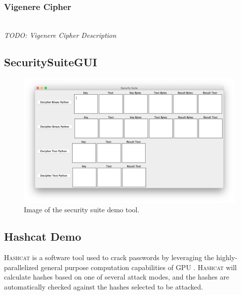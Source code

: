 \documentclass[acmlarge]{acmart}
\begin{document}

\subsubsection{Vigenere Cipher}
\hspace*{\fill} \\ %
\textit{TODO: Vigenere Cipher Description}

\subsection{SecuritySuiteGUI}\label{sec:gui}

\begin{figure}
  \centering
  \includegraphics[scale=0.40]{demo}
  \caption{Image of the security suite demo tool.}
  \label{fig:one}
\end{figure}

\subsection{Hashcat Demo}\label{sec:hashcat}

\textsc{Hashcat} is a software tool used to crack passwords by leveraging the highly-parallelized general purpose computation capabilities of GPU \cite{Hashcat}. \textsc{Hashcat} will calculate hashes based on one of several attack modes, and the hashes are automatically checked against the hashes selected to be attacked.
\end{document}

